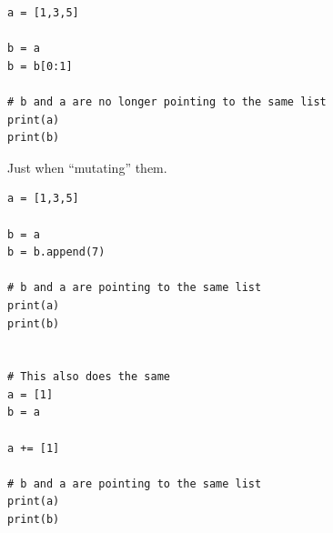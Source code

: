 \begin{lstlisting}
a = [1,3,5]

b = a
b = b[0:1]

# b and a are no longer pointing to the same list
print(a)
print(b)
\end{lstlisting}

Just when ``mutating'' them. 

\begin{lstlisting}
a = [1,3,5]

b = a
b = b.append(7)

# b and a are pointing to the same list
print(a)
print(b)


# This also does the same
a = [1]
b = a

a += [1]

# b and a are pointing to the same list
print(a)
print(b)
\end{lstlisting}